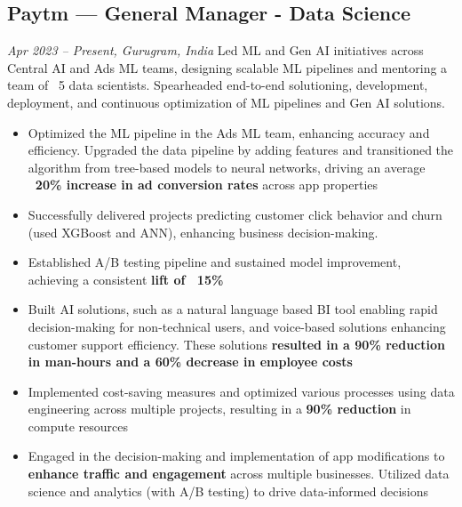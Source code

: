 \documentclass[a4paper,10pt]{article}
\begin{document}
\subsection*{Paytm — General Manager - Data Science}
\textit{Apr 2023 – Present, Gurugram, India}
Led ML and Gen AI initiatives across Central AI and Ads ML teams, designing scalable ML pipelines and mentoring a team of ~5 data scientists. Spearheaded end-to-end solutioning, development, deployment, and continuous optimization of ML pipelines and Gen AI solutions.
\begin{itemize}[leftmargin=1em]
    \item Optimized the ML pipeline in the Ads ML team, enhancing accuracy and efficiency. Upgraded the data pipeline by adding features and transitioned the algorithm from tree-based models to neural networks, driving an average \textbf{~20\% increase in ad conversion rates} across app properties
    \item Successfully delivered projects predicting customer click behavior and churn (used XGBoost and ANN), enhancing business decision-making.
    \item Established A/B testing pipeline and sustained model improvement, achieving a consistent \textbf{lift of ~15\%}
    \item Built AI solutions, such as a natural language based BI tool enabling rapid decision-making for non-technical users, and voice-based solutions enhancing customer support efficiency. These solutions \textbf{resulted in a 90\% reduction in man-hours and a 60\% decrease in employee costs}
    \item Implemented cost-saving measures and optimized various processes using data engineering across multiple projects, resulting in a \textbf{90\% reduction} in compute resources
    \item Engaged in the decision-making and implementation of app modifications to \textbf{enhance traffic and engagement} across multiple businesses. Utilized data science and analytics (with A/B testing) to drive data-informed decisions
\end{itemize}
\end{document}
